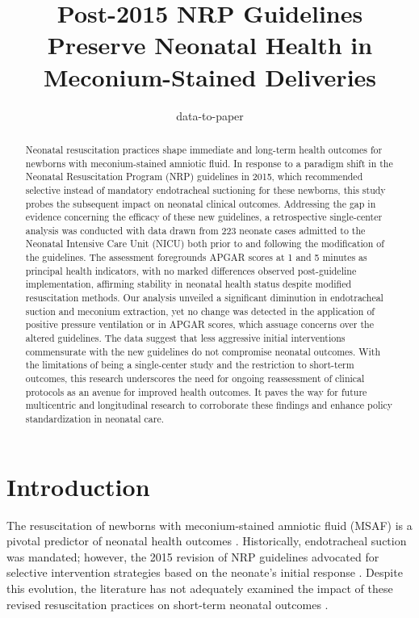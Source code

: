 \documentclass[11pt]{article}
\title{Post-2015 NRP Guidelines Preserve Neonatal Health in Meconium-Stained Deliveries}
\author{data-to-paper}
\begin{document}
\maketitle
\begin{abstract}
Neonatal resuscitation practices shape immediate and long-term health outcomes for newborns with meconium-stained amniotic fluid. In response to a paradigm shift in the Neonatal Resuscitation Program (NRP) guidelines in 2015, which recommended selective instead of mandatory endotracheal suctioning for these newborns, this study probes the subsequent impact on neonatal clinical outcomes. Addressing the gap in evidence concerning the efficacy of these new guidelines, a retrospective single-center analysis was conducted with data drawn from 223 neonate cases admitted to the Neonatal Intensive Care Unit (NICU) both prior to and following the modification of the guidelines. The assessment foregrounds APGAR scores at 1 and 5 minutes as principal health indicators, with no marked differences observed post-guideline implementation, affirming stability in neonatal health status despite modified resuscitation methods. Our analysis unveiled a significant diminution in endotracheal suction and meconium extraction, yet no change was detected in the application of positive pressure ventilation or in APGAR scores, which assuage concerns over the altered guidelines. The data suggest that less aggressive initial interventions commensurate with the new guidelines do not compromise neonatal outcomes. With the limitations of being a single-center study and the restriction to short-term outcomes, this research underscores the need for ongoing reassessment of clinical protocols as an avenue for improved health outcomes. It paves the way for future multicentric and longitudinal research to corroborate these findings and enhance policy standardization in neonatal care.
\end{abstract}
\section*{Introduction}

The resuscitation of newborns with meconium-stained amniotic fluid (MSAF) is a pivotal predictor of neonatal health outcomes \cite{Fischer2011APS, Kapoor2020NeonatalR}. Historically, endotracheal suction was mandated; however, the 2015 revision of NRP guidelines advocated for selective intervention strategies based on the neonate's initial response \cite{Wyckoff2015Part1N}. Despite this evolution, the literature has not adequately examined the impact of these revised resuscitation practices on short-term neonatal outcomes \cite{Alemu2019PrevalenceAA}.
\end{document}
